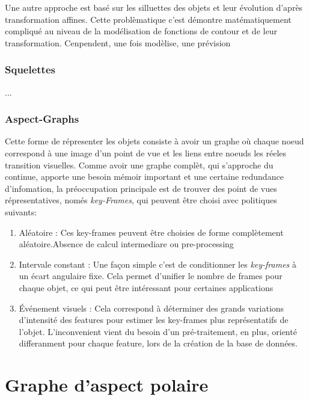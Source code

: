 Une autre approche est basé sur les silluettes des objets et leur
évolution d'après transformation affines. Cette problèmatique c'est
démontre matématiquement compliqué au niveau de la modélisation de
fonctions de contour et de leur transformation. Cenpendent, une fois
modèlise, une prévision

\subsubsection{Squelettes}
...

\subsubsection{Aspect-Graphs}

Cette forme de répresenter les objets consiste à avoir un graphe où
chaque noeud correspond à une image d'un point de vue et les liens
entre noeuds les réeles transition visuelles. Comme avoir une graphe
complèt, qui s'approche du continue, apporte une besoin mémoir
important et une certaine redundance d'infomation, la préoccupation
principale est de trouver des point de vues répresentatives, només
\textit{key-Frames}, qui peuvent être choisi avec politiques suivants:
\begin{enumerate}
\item Aléatoire : Ces key-frames peuvent être choisies de forme
  complètement aléatoire.Absence de calcul intermediare ou
  pre-processing

\item Intervale constant : Une façon simple c'est de conditionner les
  \textit{key-frames} à un écart angulaire fixe. Cela permet d'unifier
  le nombre de frames pour chaque objet, ce qui peut être intéressant
  pour certaines applications

\item Événement visuels : Cela correspond à déterminer des grands
  variations d'intensité des features pour estimer les key-frames plus
  représentatifs de l'objet. L'inconvenient vient du besoin d'un
  pré-traitement, en plus, orienté differanment pour chaque feature,
  lors de la création de la base de données.

\end{enumerate}

\section {Graphe d'aspect polaire}

